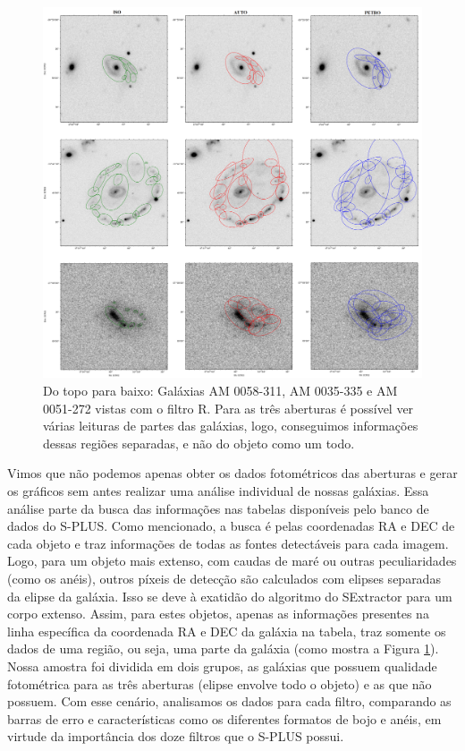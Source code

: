 \begin{figure}[h]
  \centering 
  \includegraphics[width=1.0\textwidth]{Imagens/aberturas_am0058311.png} 
  \caption[Exemplos de quando mais de uma abertura é aplicada em uma galáxia.]{Do topo para baixo: Galáxias AM 0058-311, AM 0035-335 e AM 0051-272 vistas com o filtro R. Para as três aberturas é possível ver várias leituras de partes das galáxias, logo, conseguimos informações dessas regiões separadas, e não do objeto como um todo.}
  \label{fig:aberturas_am0058311} 
\end{figure}

Vimos que não podemos apenas obter os dados fotométricos das aberturas e gerar os gráficos sem antes realizar uma análise individual de nossas galáxias. Essa análise parte da busca das informações nas tabelas disponíveis pelo banco de dados do S-PLUS. Como mencionado, a busca é pelas coordenadas RA e DEC de cada objeto e traz informações de todas as fontes detectáveis para cada imagem. Logo, para um objeto mais extenso, com caudas de maré ou outras peculiaridades (como os anéis), outros píxeis de detecção são calculados com elipses separadas da elipse da galáxia. Isso se deve à exatidão do algoritmo do SExtractor para um corpo extenso. Assim, para estes objetos, apenas as informações presentes na linha específica da coordenada RA e DEC da galáxia na tabela, traz somente os dados de uma região, ou seja, uma parte da galáxia (como mostra a Figura \ref{fig:aberturas_am0058311}). Nossa amostra foi dividida em dois grupos, as galáxias que possuem qualidade fotométrica para as três aberturas (elipse envolve todo o objeto) e as que não possuem. Com esse cenário, analisamos os dados para cada filtro, comparando as barras de erro e características como os diferentes formatos de bojo e anéis, em virtude da importância dos doze filtros que o S-PLUS possui.


